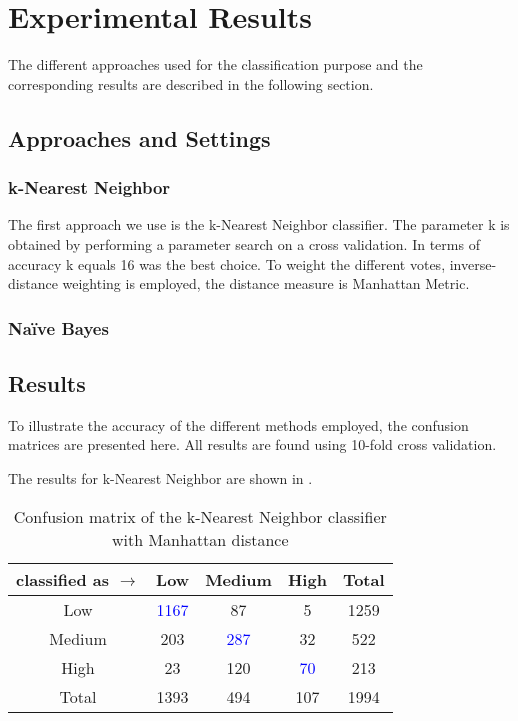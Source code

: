 \section{Experimental Results}
The different approaches used for the classification purpose and the corresponding results are described in the following section. 
\subsection{Approaches and Settings}

\subsubsection*{k-Nearest Neighbor}
The first approach we use is the k-Nearest Neighbor classifier. The parameter k is obtained by performing a parameter search on a cross validation. In terms of accuracy k equals 16 was the best choice. To weight the different votes, inverse-distance weighting is employed, the distance measure is Manhattan Metric. 

\subsubsection*{Na\"ive Bayes}

\subsection{Results}
To illustrate the accuracy of the different methods employed, the confusion matrices are presented here. All results are found using 10-fold cross validation.

The results for k-Nearest Neighbor are shown in .
\begin{table}[H]
	\centering
	\caption{Confusion matrix of the k-Nearest Neighbor classifier with Manhattan distance}
	\label{tab:mat-knn}
	\begin{tabular}[c]{c|ccc||c}
		classified as \(\rightarrow\) & \textbf{Low} & \textbf{Medium} & \textbf{High} & Total\\ \hline
		Low & \textcolor{blue}{1167} & 87 & 5 & 1259 \\
		Medium & 203 & \textcolor{blue}{287} & 32 & 522 \\
		High & 23 & 120 & \textcolor{blue}{70} & 213 \\ \hline \hline
		Total & 1393 & 494 & 107 & 1994 \\
	\end{tabular}
\end{table}

